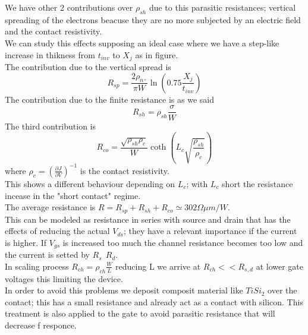 We have other 2 contributions over $\rho_{sh}$ due to this parasitic resistances; vertical spreading of the electrons beacuse they are no more subjected by an electric field and the contact resistivity.\\
We can study this effects supposing an ideal case where we have a step-like increase in thikness from $t_{inv}$ to $X_j$ as in figure.\\
\vspace{5mm}
The contribution due to the vertical spread is 
\begin{equation}
R_{sp}=\frac{2\rho_{n^+}}{\pi W}\ln(0.75 \frac{X_j}{t_{inv}})
\end{equation}
\vspace{5mm}
The contribution due to the finite resistance is as we said 
\begin{equation}
R_{sh}=\rho_{sh}\frac{\sigma}{W}
\end{equation}
\vspace{5mm}
The third contribution is 
\begin{equation}
R_{co}=\frac{\sqrt{\rho_{sh}\rho_c}}{W}\coth(L_c\sqrt{\frac{\rho_{sh}}{\rho_c}})
\end{equation}
where $\rho_c=(\frac{\partial J}{\partial V})^{-1}$ is the contact resistivity.\\
This shows a different behaviour depending on $L_c$; with $L_c$ short the resistance incease in the "short contact" regime.\\
\vspace{5mm}
The average resistance is $R=R_{sp}+R_{sh}+R_{co}\simeq 302 \Omega\mu m/W$.\\
This can be modeled as resistance in series with source and drain that has the effects of reducing the actual $V_{ds}$; they have a relevant importance if the current is higher. If $V_{gs}$ is increased too much the channel resistance becomes too low and the current is setted by $R_s \ \ R_{d}$.\\
\vspace{5mm}
In scaling process $R_{ch}=\rho_{ch}\frac{W}{L}$ reducing L we arrive at $R_{ch}<<R_{s,d}$ at lower gate voltages this limiting the device.\\
In order to avoid this problems we deposit composit material like $TiSi_2$ over the contact; this has a small resistance and already act as a contact with silicon. This treatment is also applied to the gate to avoid parasitic resistance that will decrease f responce.\\

